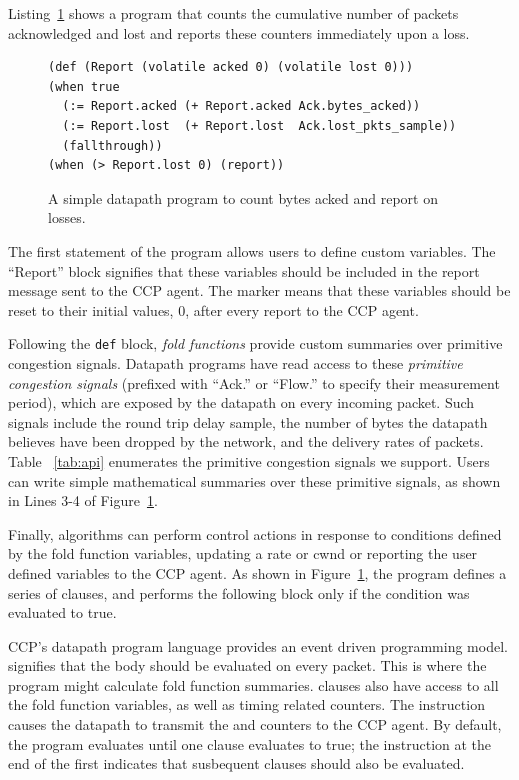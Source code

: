 Listing~\ref{lst:design:simple_datapath_prog} shows a program that counts the cumulative number of packets acknowledged and lost and reports these counters immediately upon a loss.
\begin{figure}[t]
{\footnotesize
\begin{verbatim}
(def (Report (volatile acked 0) (volatile lost 0)))
(when true
  (:= Report.acked (+ Report.acked Ack.bytes_acked))
  (:= Report.lost  (+ Report.lost  Ack.lost_pkts_sample))
  (fallthrough))
(when (> Report.lost 0) (report))
\end{verbatim}
\caption{A simple datapath program to count bytes acked and report on losses.} \label{lst:design:simple_datapath_prog}
}
\end{figure}
The first statement of the program allows users to define custom variables.
The ``Report'' block signifies that these variables should be included in the report message sent to the CCP agent.
The  marker means that these variables should be reset to their initial values, 0, after every report to the CCP agent.

Following the \texttt{def} block, \textit{fold functions} provide custom summaries over primitive congestion signals.
Datapath programs have read access to these \textit{primitive congestion signals} (prefixed with ``Ack.'' or ``Flow.'' to specify their measurement period), which are exposed by the datapath on every incoming packet. Such signals include the round trip delay sample, the number of bytes the datapath believes have been dropped by the network, and the delivery rates of packets. Table ~\ref{tab:api} enumerates the primitive congestion signals we support.
Users can write simple mathematical summaries over these primitive signals, as shown in Lines 3-4 of Figure~\ref{lst:design:simple_datapath_prog}.

Finally, algorithms can perform control actions in response to conditions defined by the fold function variables, \eg updating a rate or cwnd or reporting the user defined variables to the CCP agent.
As shown in Figure~\ref{lst:design:simple_datapath_prog}, the program defines a series of  clauses, and performs the following block only if the condition was evaluated to true.

CCP's datapath program language provides an event driven programming model.
 signifies that the body should be evaluated on every packet.
This is where the program might calculate fold function summaries.
 clauses also have access to all the fold function variables, as well as timing related counters.
The  instruction causes the datapath to transmit the  and  counters to the CCP agent.
By default, the program evaluates until one  clause evaluates to true; the  instruction at the end of the first  indicates that susbequent  clauses should also be evaluated.

